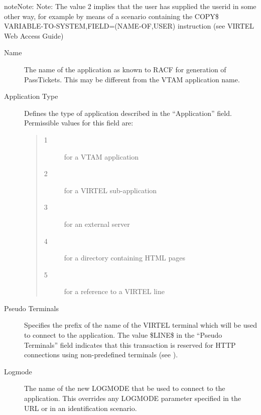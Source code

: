 \documentclass[letterpaper,10pt,english]{sphinxmanual}
\begin{document}
\begin{sphinxadmonition}{note}{Note:}
Note: The value 2 implies that the user has supplied the userid in some other way, for example by means of a scenario containing the COPY\$ VARIABLE-TO-SYSTEM,FIELD=(NAME-OF,USER) instruction (see VIRTEL Web Access Guide)
\end{sphinxadmonition}
\begin{description}
\item[{Name}] \leavevmode
The name of the application as known to RACF for generation of PassTickets. This may be different from the VTAM application name.

\item[{Application Type}] \leavevmode
Defines the type of application described in the “Application” field. Permissible values for this field are:
\begin{quote}
\begin{description}
\item[{1}] \leavevmode
for a VTAM application

\item[{2}] \leavevmode
for a VIRTEL sub-application

\item[{3}] \leavevmode
for an external server

\item[{4}] \leavevmode
for a directory containing HTML pages

\item[{5}] \leavevmode
for a reference to a VIRTEL line

\end{description}
\end{quote}

\item[{Pseudo Terminals}] \leavevmode
Specifies the prefix of the name of the VIRTEL terminal which will be used to connect to the application. The value \$LINE\$ in the “Pseudo Terminals” field indicates that this transaction is reserved for HTTP connections using non-predefined terminals (see {\hyperref[\detokenize{connectivity_guide:v461cn-forceluname}]{}}).

\item[{Logmode}] \leavevmode
The name of the new LOGMODE that  be used to connect to the application. This overrides any LOGMODE parameter specified in the URL or in an identification scenario.


\end{description}
\end{document}
